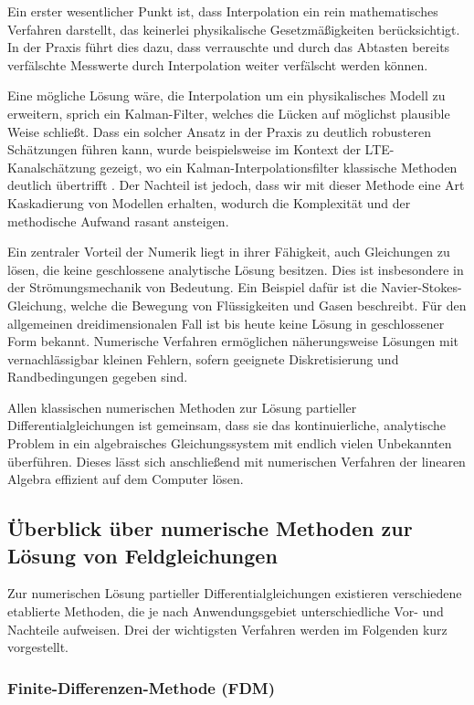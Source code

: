 Ein erster wesentlicher Punkt ist, dass Interpolation ein rein mathematisches Verfahren darstellt, das keinerlei physikalische Gesetzmäßigkeiten berücksichtigt.
In der Praxis führt dies dazu, dass verrauschte und durch das Abtasten bereits verfälschte Messwerte durch Interpolation weiter verfälscht werden können.

Eine mögliche Lösung wäre, die Interpolation um ein physikalisches Modell zu erweitern, sprich ein Kalman-Filter, welches die Lücken auf möglichst plausible Weise schließt.
Dass ein solcher Ansatz in der Praxis zu deutlich robusteren Schätzungen führen kann, wurde beispielsweise im Kontext der LTE-Kanalschätzung gezeigt, wo ein Kalman-Interpolationsfilter klassische Methoden deutlich übertrifft \cite{parallelisierung:Dai2012}.
Der Nachteil ist jedoch, dass wir mit dieser Methode eine Art Kaskadierung von Modellen erhalten, wodurch die Komplexität und der methodische Aufwand rasant ansteigen.

Ein zentraler Vorteil der Numerik liegt in ihrer Fähigkeit, auch Gleichungen zu lösen, die keine geschlossene analytische Lösung besitzen.
Dies ist insbesondere in der Strömungsmechanik von Bedeutung.
Ein Beispiel dafür ist die Navier-Stokes-Gleichung, welche die Bewegung von Flüssigkeiten und Gasen beschreibt.
Für den allgemeinen dreidimensionalen Fall ist bis heute keine Lösung in geschlossener Form bekannt.
Numerische Verfahren ermöglichen näherungsweise Lösungen mit vernachlässigbar kleinen Fehlern, sofern geeignete Diskretisierung und Randbedingungen gegeben sind.

Allen klassischen numerischen Methoden zur Lösung partieller Differentialgleichungen ist gemeinsam, dass sie das kontinuierliche, analytische Problem in ein algebraisches Gleichungssystem mit endlich vielen Unbekannten überführen.
Dieses lässt sich anschließend mit numerischen Verfahren der linearen Algebra effizient auf dem Computer lösen.

\subsection{Überblick über numerische Methoden zur Lösung von Feldgleichungen}

Zur numerischen Lösung partieller Differentialgleichungen existieren verschiedene etablierte Methoden, die je nach Anwendungsgebiet unterschiedliche Vor- und Nachteile aufweisen.
Drei der wichtigsten Verfahren werden im Folgenden kurz vorgestellt.

\subsubsection{Finite-Differenzen-Methode (FDM)}
\label{parallelisierung:section:fdm}

